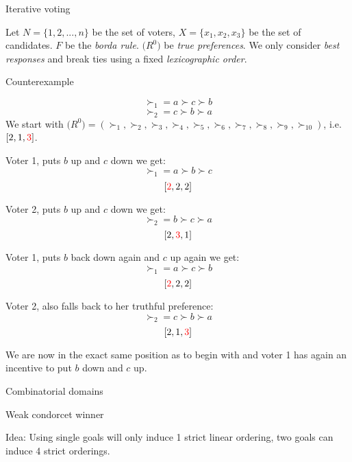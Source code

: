 \documentclass[12pt]{article}
\newenvironment{question}[2][Question]{\begin{trivlist}
\item[\hskip \labelsep {\bfseries #1}\hskip \labelsep {\bfseries #2.}]}{\end{trivlist}}
\newenvironment{answer}[2][Answer]{\begin{trivlist}
\item[\hskip \labelsep {\bfseries #1}\hskip \labelsep {\bfseries #2:}]}{\end{trivlist}}
\begin{document}
\begin{question}{2}{Iterative voting}

Let $N=\{1,2, ..., n\}$ be the set of voters, $X=\{x_1,x_2,x_3\}$ be the set of candidates. $F$ be the \textit{borda rule}. $\boldsymbol(R^0)$ be \textit{true preferences}. We only consider \textit{best responses} and break ties using a fixed \textit{lexicographic order}.
\end{question}

\begin{answer}{a)}{Counterexample}

$$\succ_1=a\succ c\succ b$$
$$\succ_2=c\succ b\succ a$$
We start with $\boldsymbol(R^0)=(\succ_1,\succ_2,\succ_3,\succ_4,\succ_5,\succ_6,\succ_7,\succ_8,\succ_9,\succ_10)$, i.e. $[2,1,\textcolor{red}{3}]$.

Voter 1, puts $b$ up and $c$ down we get:
$$\succ_1=a\succ b\succ c$$
$$[\textcolor{red}{2},2,2]$$

Voter 2, puts $b$ up and $c$ down we get:
$$\succ_2=b\succ c\succ a$$
$$[2,\textcolor{red}{3},1]$$

Voter 1, puts $b$ back down again and $c$ up again we get:
$$\succ_1=a\succ c\succ b$$
$$[\textcolor{red}{2},2,2]$$

Voter 2, also falls back to her truthful preference:
$$\succ_2=c\succ b\succ a$$
$$[2,1,\textcolor{red}{3}]$$

We are now in the exact same position as to begin with and voter 1 has again an incentive to put $b$ down and $c$ up.
\end{answer}

\begin{question}{3}{Combinatorial domains}


\end{question}

\begin{answer}{a)}{Weak condorcet winner}

Idea: Using single goals will only induce 1 strict linear ordering, two goals can induce 4 strict orderings.

\end{answer}
\end{document}
